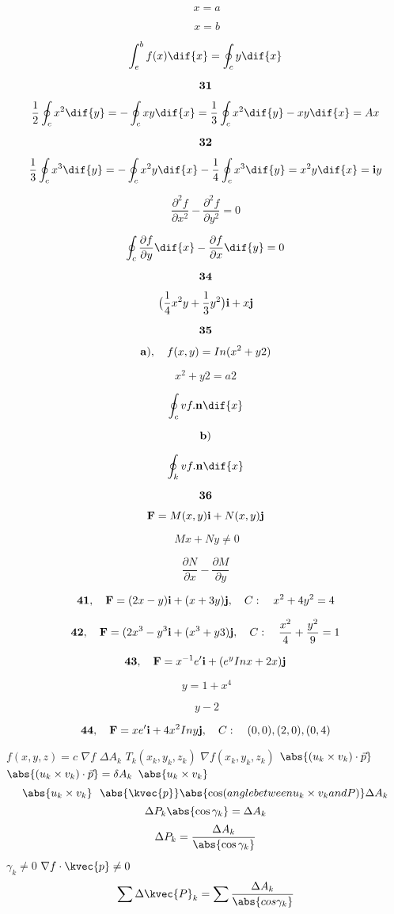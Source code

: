 \[ \ x=a\]

\[ \ x=b\]

\[ \int_{e}^{b}f(x)\dif{x}=\oint_{c}y\dif{x}\]

\[ \bold {31}\]

\[ \frac{1}{2}\oint_{c}x^{2}\dif{y}=-\oint_{c}xy\dif{x}=\frac{1}{3}\oint_{c}x^{2}\dif{y}-xy\dif{x}=Ax\]

\[ \bold{32}\]

\[ \frac{1}{3}\oint_{c}x^{3}\dif{y}= -\oint_{c}x^{2}y\dif{x}-\frac{1}{4}\oint_{c}x^{3}\dif{y}=x^{2}y\dif{x}=\bold iy\]

\[ \frac{ \partial^{2}f}{\partial x^{2}}-\frac{ \partial^{2}f}{\partial y^{2}}=0\]

\[ \oint_{c}\frac{\partial f}{\partial y}\dif{x}-\frac{\partial f}{\partial x}\dif{y}=0\]

\[ \bold{34}\]

\[ \big(\frac{1}{4}x^{2}y+\frac{1}{3}y^{2}\big)\bold i +x\bold j\]

\[ \bold {35}\]

\[ \bold a), \quad f(x,y)=In(x^{2}+y{2})\]

\[ x^{2}+y{2}=a{2}\]

\[ \oint_{c}vf. \bold n\dif{x}\]

\[ \bold b)\]

\[ \oint_{k}vf.\bold n \dif {x}\]

\[ \bold {36}\]

\[ \bold F=M(x,y)\bold i+N(x,y)\bold j\]

\[ \ Mx+Ny\neq 0 \]

\[ \frac{\partial N}{\partial x}-\frac{\partial M}{\partial y}\]

\[ \bold {41}, \quad \bold F= (2x-y)\bold i +(x+3y)\bold j,\quad C:\quad x^{2}+4y^{2}=4\]

\[ \bold {42}, \quad \bold F=(2x^{3}-y^{3}\bold i+(x^{3}+y{3})\bold j, \quad C:\quad \frac{x^{2}}{4}+\frac{y^{2}}{9}=1\]

\[ \bold {43},\quad \bold F= x^{-1}e'\bold i +(e^{y}In x+2x)\bold j\]

\[ \ y=1+x^{4}\]

\[ \ y-2\]

\[ \bold {44}, \quad \bold F= xe'\bold i +4x^{2} In y\bold j, \quad C: \quad (0,0),(2,0),(0,4)\]

       
\(  f(x,y,z) =c  \)
\( \nabla f  \)
\( \Delta  A_{k}  \)
\( T_{k}(x_{k},y_{k},z_{k})  \)
\( \nabla f (x_{k},y_{k},z_{k} )  \)
\(  \abs{(u_{k}\times v_{k})\cdot \vec{p}} \) 
\( \abs{(u_{k}\times v_{k})\cdot \vec{p}} =\delta A_{k}\)
\(  \abs{u_{k}\times v_{k}}\)
 \[  \abs{u_{k}\times v_{k}} \,\,\,\, \abs{\kvec{p}} \abs{\cos(angle between u_{k}\times v_{k} and P)}\Delta A_{k}  \]
 \[ \Delta P_{k} \abs{\cos \gamma _{k}}= \Delta A_{k}   \]
 \[ \Delta P_{k}=\frac{\Delta A_{k}}{\abs{\cos \gamma _{k}}}   \]   
 \( \gamma _{k}\neq 0  \)
\( \nabla f \cdot \kvec {p}\neq 0 \)
\[ \sum \Delta \kvec{P}_{k}=\sum \frac{\Delta A_{k}}{\abs{cos \gamma _{k}}}   \]  

